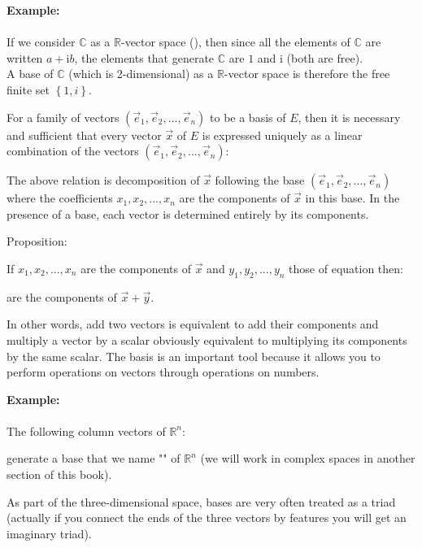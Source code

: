 	\begin{tcolorbox}[colframe=black,colback=white,sharp corners]
	\textbf{{\Large {}}Example:}\\\\
	If we consider $\mathbb{C}$ as a $\mathbb{R}$-vector space (), then since all the elements of $\mathbb{C}$ are written $a+\mathrm{i}b$, the elements that generate $\mathbb{C}$ are $1$ and $\mathrm{i}$ (both are free).\\
	
	A base of $\mathbb{C}$ (which is 2-dimensional) as a $\mathbb{R}$-vector space is therefore the free finite set $\left\lbrace 1, i \right\rbrace$.
	\end{tcolorbox}
	For a family of vectors $(\vec{e}_1,\vec{e}_2,...,\vec{e}_n)$ to be a basis of $E$, then it is necessary and sufficient that every vector $\vec{x}$ of $E$ is expressed uniquely as a linear combination of the vectors $(\vec{e}_1,\vec{e}_2,...,\vec{e}_n)$:
	
	The above relation is decomposition of $\vec{x}$ following the base $(\vec{e}_1,\vec{e}_2,...,\vec{e}_n)$ where the coefficients $x_1,x_2,...,x_n$ are the components of $\vec{x}$ in this base. In the presence of a base, each vector is determined entirely by its components.
	
	Proposition:
	
	If $x_1,x_2,...,x_n$ are the components of $\vec{x}$ and $y_1,y_2,...,y_n$ those of equation then: 
	
	are the components of $\vec{x}+\vec{y}$.
	
	In other words, add two vectors is equivalent to add their components and multiply a vector by a scalar obviously equivalent to multiplying its components by the same scalar. The basis is an important tool because it allows you to perform operations on vectors through operations on numbers.
	
	\begin{tcolorbox}[colframe=black,colback=white,sharp corners]
	\textbf{{\Large {}}Example:}\\\\
	The following column vectors of $\mathbb{R}^n$:
	
	generate a base that we name "" of $\mathbb{R}^n$ (we will work in complex spaces in another section of this book).
	\end{tcolorbox}
	\begin{tcolorbox}[title=Remark,colframe=black,arc=10pt]
	As part of the three-dimensional space, bases are very often treated as a triad (actually if you connect the ends of the three vectors by features you will get an imaginary triad).
	\end{tcolorbox}	
	
